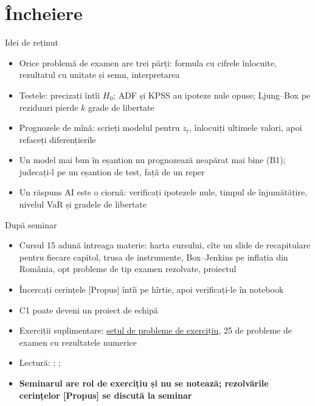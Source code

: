 \section{Încheiere}

\begin{frame}{Idei de reținut}
\itemsize{\small}
\begin{itemize}
    \item Orice problemă de examen are trei părți: formula cu cifrele înlocuite, rezultatul cu unitate și semn, interpretarea
    \item Testele: precizați întîi $H_0$; ADF și KPSS au ipoteze nule opuse; Ljung--Box pe reziduuri pierde $k$ grade de libertate
    \item Prognozele de mînă: scrieți modelul pentru $z_t$, înlocuiți ultimele valori, apoi refaceți diferențierile
    \item Un model mai bun în eșantion nu prognozează neapărat mai bine (B1); judecați-l pe un eșantion de test, față de un reper
    \item Un răspuns AI este o ciornă: verificați ipotezele nule, timpul de înjumătățire, nivelul VaR și gradele de libertate
\end{itemize}
\end{frame}

\begin{frame}{După seminar}
\itemsize{\small}
\begin{itemize}
    \item Cursul 15 adună întreaga materie: harta cursului, cîte un slide de recapitulare pentru fiecare capitol, trusa de instrumente, Box--Jenkins pe inflația din România, opt probleme de tip examen rezolvate, proiectul
    \item Încercați cerințele [Propus] întîi pe hîrtie, apoi verificați-le în notebook
    \item C1 poate deveni un proiect de echipă
    \item Exerciții suplimentare: \href{https://danpele.github.io/Time-Series-Analysis/exam/practice/probleme_examen_ro.pdf}{setul de probleme de exercițiu}, 25 de probleme de examen cu rezultatele numerice
    \item Lectură: ; ; 
    \item \textbf{Seminarul are rol de exercițiu și nu se notează; rezolvările cerințelor [Propus] se discută la seminar}
\end{itemize}
\end{frame}


